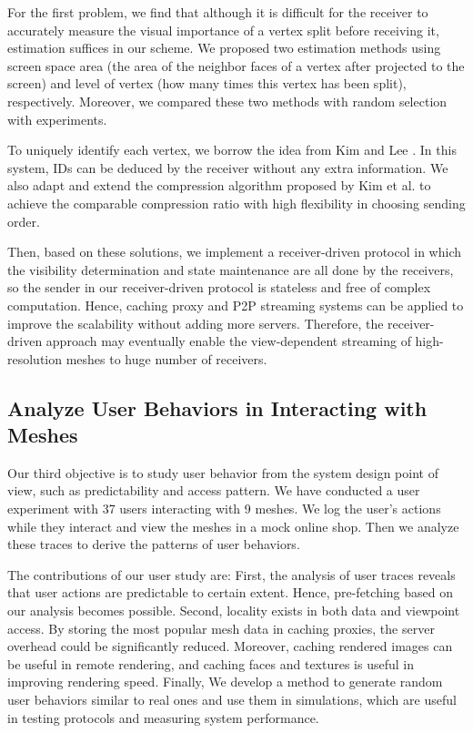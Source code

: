     For the first problem, we find that although it is difficult
    for the receiver to accurately measure
    the visual importance of a vertex split before receiving it, 
    estimation suffices in our scheme. 
    We proposed two estimation methods using screen space area (the area of the neighbor faces
    of a vertex after projected to the screen) and level of vertex (how many times this vertex
    has been split), respectively. Moreover, we compared these two methods with random selection
    with experiments.
    
    To uniquely identify each vertex, we borrow the idea from Kim and Lee \cite{kim01truly}.
    In this system, IDs can be deduced by the receiver without any extra information. 
    We also adapt and extend the compression algorithm proposed by Kim et al. \cite{multiresolution:kim}
    to achieve the comparable compression ratio with high flexibility in choosing 
    sending order.
    
    Then, based on these solutions, we implement a receiver-driven protocol in which 
    the visibility determination and state maintenance are all done by the receivers, so 
    the sender in our receiver-driven protocol is stateless and free of complex computation.
    Hence, caching proxy and P2P streaming systems can be applied to improve
    the scalability without adding more servers.  
    Therefore, the receiver-driven approach may eventually
    enable the view-dependent streaming of high-resolution meshes to huge number of receivers.
    
    \subsection{Analyze User Behaviors in Interacting with Meshes}
    Our third objective is to study user behavior from the system design point of view, 
    such as predictability and access pattern.
    We have conducted a user experiment with 37 users interacting with 9 meshes.
    We log the user's actions while they interact and view the meshes in a mock online shop.
    Then we analyze these traces to derive the patterns of user behaviors.

    The contributions of our user study are:
    First, the analysis of user traces reveals that 
        user actions are predictable to certain extent. 
        Hence, pre-fetching based on our analysis becomes possible.
        Second, 
        locality exists in both data and viewpoint access. By
        storing the most popular mesh data in caching proxies, 
        the server overhead could be significantly reduced. 
        Moreover, caching rendered images can be useful in remote rendering,
        and caching faces and textures is useful in improving rendering speed.
        Finally,
        We develop a method to generate random user behaviors similar to real ones
        and use them in simulations, 
        which are useful in testing protocols and measuring system performance.


